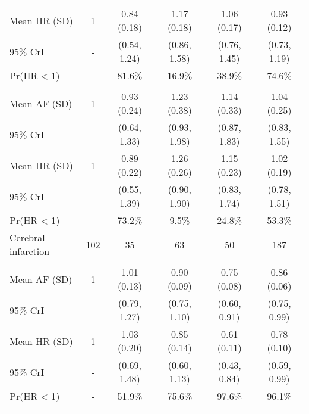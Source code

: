 \documentclass[nutrients,article,submitted,moreauthors,pdftex]{mdpi}
\begin{document}
\begin{table}[H]
{\begin{tabular}[t]{lccccc}
\rowcolor{gray!6}  \hspace{1em}Mean HR (SD) & 1 & 0.84 (0.18) & 1.17 (0.18) & 1.06 (0.17) & 0.93 (0.12)\\
\hspace{1em}95\% CrI & - & (0.54, 1.24) & (0.86, 1.58) & (0.76, 1.45) & (0.73, 1.19)\\
\rowcolor{gray!6}  \hspace{1em}Pr(HR < 1) & - & 81.6\% & 16.9\% & 38.9\% & 74.6\%\\
\addlinespace[0.3em]
\multicolumn{6}{l}{\textbf{Model 2}}\\
\hspace{1em}Mean AF (SD) & 1 & 0.93 (0.24) & 1.23 (0.38) & 1.14 (0.33) & 1.04 (0.25)\\
\rowcolor{gray!6}  \hspace{1em}95\% CrI & - & (0.64, 1.33) & (0.93, 1.98) & (0.87, 1.83) & (0.83, 1.55)\\
\hspace{1em}Mean HR (SD) & 1 & 0.89 (0.22) & 1.26 (0.26) & 1.15 (0.23) & 1.02 (0.19)\\
\rowcolor{gray!6}  \hspace{1em}95\% CrI & - & (0.55, 1.39) & (0.90, 1.90) & (0.83, 1.74) & (0.78, 1.51)\\
\hspace{1em}Pr(HR < 1) & - & 73.2\% & 9.5\% & 24.8\% & 53.3\%\\
\hline
\rowcolor{gray!6}  Cerebral infarction & 102 & 35 & 63 & 50 & 187\\
\addlinespace[0.3em]
\multicolumn{6}{l}{\textbf{Model 0}}\\
\hspace{1em}Mean AF (SD) & 1 & 1.01 (0.13) & 0.90 (0.09) & 0.75 (0.08) & 0.86 (0.06)\\
\rowcolor{gray!6}  \hspace{1em}95\% CrI & - & (0.79, 1.27) & (0.75, 1.10) & (0.60, 0.91) & (0.75, 0.99)\\
\hspace{1em}Mean HR (SD) & 1 & 1.03 (0.20) & 0.85 (0.14) & 0.61 (0.11) & 0.78 (0.10)\\
\rowcolor{gray!6}  \hspace{1em}95\% CrI & - & (0.69, 1.48) & (0.60, 1.13) & (0.43, 0.84) & (0.59, 0.99)\\
\hspace{1em}Pr(HR < 1) & - & 51.9\% & 75.6\% & 97.6\% & 96.1\%\\
\addlinespace[0.3em]
\multicolumn{6}{l}{\textbf{Model 1}}\\

\end{tabular}}
\end{table}
\end{document}
